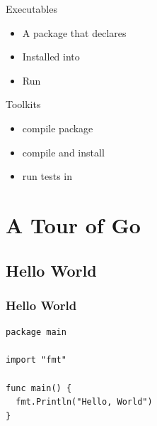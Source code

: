 \documentclass[xetex,mathserif,serif,12pt]{beamer}
\begin{document}
\begin{frame}{Executables}
  \begin{itemize}[<+->]
  \item A package that declares 
  \item Installed into 
  \item Run 
  \end{itemize}
\end{frame}

\begin{frame}{Toolkits}
  \begin{itemize}[<+->]
  \item {} compile package
  \item {} compile and install
  \item {} run tests in 
  \end{itemize}
\end{frame}

\section{A Tour of Go}
\label{sec:tour}


\subsection{Hello World}
\begin{frame}[fragile]
  \frametitle{Hello World}

  \begin{beamer@nomargin}
    \begin{lstlisting}[basicstyle=\small\ttfamily]
package main

import "fmt"

func main() {
  fmt.Println("Hello, World")
}
    \end{lstlisting}
  \end{beamer@nomargin}
\end{frame}
\end{document}
